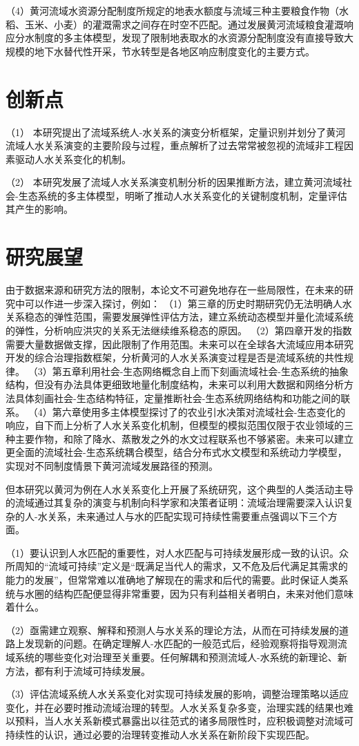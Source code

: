 （4）黄河流域水资源分配制度所规定的地表水额度与流域三种主要粮食作物（水稻、玉米、小麦）的灌溉需求之间存在时空不匹配。通过发展黄河流域粮食灌溉响应分水制度的多主体模型，发现了限制地表取水的水资源分配制度没有直接导致大规模的地下水替代性开采，节水转型是各地区响应制度变化的主要方式。

\section{创新点}

（1） 本研究提出了流域系统人-水关系的演变分析框架，定量识别并划分了黄河流域人水关系演变的主要阶段与过程，重点解析了过去常常被忽视的流域非工程因素驱动人水关系变化的机制。

（2） 本研究发展了流域人水关系演变机制分析的因果推断方法，建立黄河流域社会-生态系统的多主体模型，明晰了推动人水关系变化的关键制度机制，定量评估其产生的影响。

\section{研究展望}

由于数据来源和研究方法的限制，本论文不可避免地存在一些局限性，在未来的研究中可以作进一步深入探讨，例如：
（1）第三章的历史时期研究仍无法明确人水关系稳态的弹性范围，需要发展弹性评估方法，建立系统动态模型并量化流域系统的弹性，分析响应洪灾的关系无法继续维系稳态的原因。
（2）第四章开发的指数需要大量数据做支撑，因此限制了作用范围。未来可以在全球各大流域应用本研究开发的综合治理指数框架，分析黄河的人水关系演变过程是否是流域系统的共性规律。
（3）第五章利用社会-生态网络概念自上而下刻画流域社会-生态系统的抽象结构，但没有办法具体更细致地量化制度结构，未来可以利用大数据和网络分析方法具体刻画社会-生态结构特征，定量推断社会-生态系统网络结构和功能之间的联系。
（4）第六章使用多主体模型探讨了的农业引水决策对流域社会-生态变化的响应，自下而上分析了人水关系变化机制，但模型的模拟范围仅限于农业领域的三种主要作物，和除了降水、蒸散发之外的水文过程联系也不够紧密。未来可以建立更全面的流域社会-生态系统耦合模型，结合分布式水文模型和系统动力学模型，实现对不同制度情景下黄河流域发展路径的预测。

但本研究以黄河为例在人水关系变化上开展了系统研究，这个典型的人类活动主导的流域通过其复杂的演变与机制向科学家和决策者证明：流域治理需要深入认识复杂的人-水关系，未来通过人与水的匹配实现可持续性需要重点强调以下三个方面。

（1）要认识到人水匹配的重要性，对人水匹配与可持续发展形成一致的认识。众所周知的“流域可持续”定义是“既满足当代人的需求，又不危及后代满足其需求的能力的发展”，但常常难以准确地了解现在的需求和后代的需要。此时保证人类系统与水圈的结构匹配便显得非常重要，因为只有利益相关者明白，未来对他们意味着什么。

（2）亟需建立观察、解释和预测人与水关系的理论方法，从而在可持续发展的道路上发现新的问题。在确定理解人-水匹配的一般范式后，经验观察将指导观测流域系统的哪些变化对治理至关重要。任何解耦和预测流域人-水系统的新理论、新方法，都有利于流域可持续发展。

（3）评估流域系统人水关系变化对实现可持续发展的影响，调整治理策略以适应变化，并在必要时推动流域治理的转型。人水关系复杂多变，治理实践的结果也难以预料，当人水关系新模式暴露出以往范式的诸多局限性时，应积极调整对流域可持续性的认识，通过必要的治理转变推动人水关系在新阶段下实现匹配。
